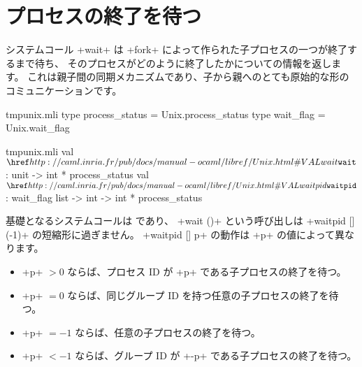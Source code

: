 \section{プロセスの終了を待つ}

システムコール \ml+wait+ は \ml+fork+ によって作られた子プロセスの一つが終了するまで待ち、
そのプロセスがどのように終了したかについての情報を返します。
これは親子間の同期メカニズムであり、子から親へのとても原始的な形のコミュニケーションです。
\label{wait}
%
\begin{codefile}{tmpunix.mli}
type process_status = Unix.process_status
type wait_flag = Unix.wait_flag
\end{codefile}
%
\begin{listingcodefile}{tmpunix.mli}
val $\indexlibvalue{Unix}{wait}$ : unit -> int * process_status
val $\libvalue{Unix}{waitpid}$ : wait_flag list -> int -> int * process_status
\end{listingcodefile}
%
基礎となるシステムコールは  であり、 \ml+wait ()+ という呼び出しは
\ml+waitpid [] (-1)+ の短縮形に過ぎません。
%
\ml+waitpid [] p+ の動作は \ml+p+ の値によって異なります。
\begin{itemize}
  \item \ml+p+ $> 0$ ならば、プロセス ID が \ml+p+ である子プロセスの終了を待つ。
  \item \ml+p+ $= 0$ ならば、同じグループ ID を持つ任意の子プロセスの終了を待つ。
  \item \ml+p+ $= -1$ ならば、任意の子プロセスの終了を待つ。
  \item \ml+p+ $<-1$ ならば、グループ ID が \ml+-p+ である子プロセスの終了を待つ。
\end{itemize}
